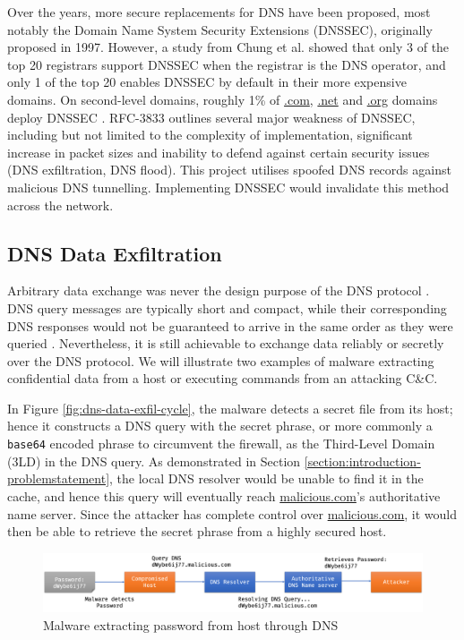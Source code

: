 \documentclass[a4paper]{report}
\newcommand{\code}{\texttt}
\begin{document}
Over the years, more secure replacements for DNS have been proposed, most notably the Domain Name System Security Extensions (DNSSEC), originally proposed in 1997\cite{RFC-2535, RFC-4033}. However, a study from Chung et al. \cite{chung-2017} showed that only 3 of the top 20 registrars support DNSSEC when the registrar is the DNS operator, and only 1 of the top 20 enables DNSSEC by default in their more expensive domains. On second-level domains, roughly 1\% of \url{.com}, \url{.net} and \url{.org} domains deploy DNSSEC \cite{chung-2017-1}. RFC-3833 \cite{RFC-3833} outlines several major weakness of DNSSEC, including but not limited to the complexity of implementation, significant increase in packet sizes and inability to defend against certain security issues (DNS exfiltration, DNS flood). This project utilises spoofed DNS records against malicious DNS tunnelling. Implementing DNSSEC would invalidate this method across the network.

\subsection{DNS Data Exfiltration}

Arbitrary data exchange was never the design purpose of the DNS protocol \cite{nadler-201936}. DNS query messages are typically short and compact, while their corresponding DNS responses would not be guaranteed to arrive in the same order as they were queried \cite{RFC-1034}. Nevertheless, it is still achievable to exchange data reliably or secretly over the DNS protocol.
We will illustrate two examples of malware extracting confidential data from a host or executing commands from an attacking C\&C. 

In Figure \ref{fig:dns-data-exfil-cycle}, the malware detects a secret file from its host; hence it constructs a DNS query with the secret phrase, or more commonly a \code{base64} encoded phrase to circumvent the firewall, as the Third-Level Domain (3LD) in the DNS query. As demonstrated in Section \ref{section:introduction-problemstatement}, the local DNS resolver would be unable to find it in the cache, and hence this query will eventually reach \url{malicious.com}'s authoritative name server. Since the attacker has complete control over \url{malicious.com}, it would then be able to retrieve the secret phrase from a highly secured host.

\begin{figure}[h!]
  \includegraphics[width=\textwidth]{imgs/dns-data-exfil-out.png}
  \caption{Malware extracting password from host through DNS}
  \label{fig:dns-data-exfil-out}
\end{figure}
\end{document}
